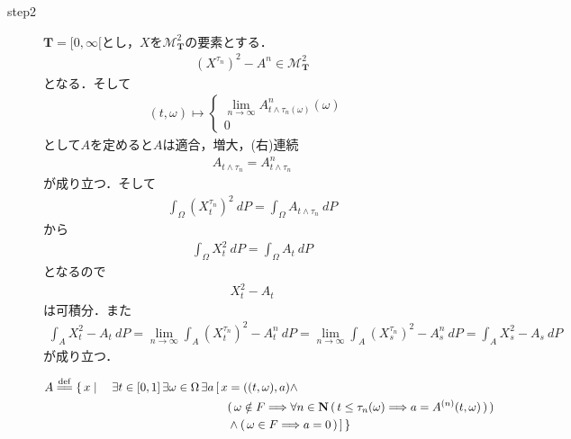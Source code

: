 \begin{sketch}
\begin{description}
			\item[step2]
				$\mathbf{T}=[0,\infty[$とし，$X$を$\mathscr{M}^2_{\mathbf{T}}$の要素とする．
				\begin{align}
					\left(X^{\tau_n}\right)^2 - A^n \in \mathscr{M}^2_{\mathbf{T}}
				\end{align}
				となる．そして
				\begin{align}
					(t,\omega) \longmapsto
					\begin{cases}
						\lim_{n \to \infty} A^n_{t \wedge \tau_n(\omega)}(\omega) & \\
						0
					\end{cases}
				\end{align}
				として$A$を定めると$A$は適合，増大，(右)連続
				\begin{align}
					A_{t \wedge \tau_n} = A^n_{t \wedge \tau_n}
				\end{align}
				が成り立つ．そして
				\begin{align}
					\int_\Omega \left(X^{\tau_n}_t\right)^2\ dP = \int_\Omega A_{t \wedge \tau_n}\ dP
				\end{align}
				から
				\begin{align}
					\int_\Omega X_t^2\ dP = \int_\Omega A_t\ dP
				\end{align}
				となるので
				\begin{align}
					X_t^2 - A_t
				\end{align}
				は可積分．また
				\begin{align}
					\int_A X_t^2 - A_t\ dP
					= \lim_{n \to \infty} \int_A \left(X^{\tau_n}_t\right)^2 - A^n_t\ dP
					= \lim_{n \to \infty} \int_A \left(X^{\tau_n}_s\right)^2 - A^n_s\ dP
					= \int_A X_s^2 - A_s\ dP
				\end{align}
				が成り立つ．
				
			
				\begin{align}
					A \defeq \{\, x \mid \quad 
					\exists t \in [0,1]\, \exists \omega \in \Omega\, \exists a\,
					&[\, x = ((t,\omega),a) \wedge \\
					&\quad (\, \omega \notin F \Longrightarrow \forall n \in \Natural\, 
					(\, t \leq \tau_{n}(\omega) \Longrightarrow a = A^{(n)}(t,\omega)\, )\, )\, \\
					&\quad \wedge (\, \omega \in F \Longrightarrow a = 0\, )\, ]\, \}
				\end{align}
			

\end{description}
\end{sketch}
